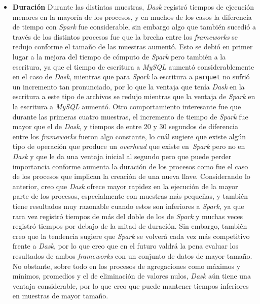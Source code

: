 \begin{itemize}
	\item \textbf{Duración} Durante las distintas muestras, \textit{Dask} registró tiempos de ejecución menores en la mayoría de los procesos, y en muchos de los casos la diferencia de tiempo con \textit{Spark} fue considerable, sin embargo algo que también sucedió a través de los distintos procesos fue que la brecha entre los \textit{frameworks} se redujo conforme el tamaño de las muestras aumentó. Esto se debió en primer lugar a la mejora del tiempo de cómputo de \textit{Spark} pero también a la escritura, ya que el tiempo de escritura a \textit{MySQL} aumentó considerablemente en el caso de \textit{Dask}, mientras que para \textit{Spark} la escritura a \texttt{parquet} no sufrió un incremento tan pronunciado, por lo que la ventaja que tenía \textit{Dask} en la escritura a este tipo de archivos se redujo mientras que la ventaja de \textit{Spark} en la escritura a \textit{MySQL} aumentó. Otro comportamiento interesante fue que durante las primeras cuatro muestras, el incremento de tiempo de \textit{Spark} fue mayor que el de \textit{Dask}, y tiempos de entre 20 y 30 segundos de diferencia entre los \textit{frameworks} fueron algo constante, lo cuál sugiere que existe algún tipo de operación que produce un \textit{overhead} que existe en\ \textit{Spark} pero no en \textit{Dask} y que le da una ventaja inicial al segundo pero que puede perder importancia conforme aumenta la duración de los procesos como fue el caso de los procesos que implican la creación de una nueva llave. Considerando lo anterior, creo que \textit{Dask} ofrece mayor rapidez en la ejecución de la mayor parte de los procesos, especialmente con muestras más pequeñas, y también tiene resultados muy razonable cuando estos son inferiores a \textit{Spark}, ya que rara vez registró tiempos de más del doble de los de \textit{Spark} y muchas veces registró tiempos por debajo de la mitad de duración. Sin embargo, también creo que la tendencia sugiere que \textit{Spark} se volverá cada vez más competitivo frente a \textit{Dask}, por lo que creo que en el futuro valdrá la pena evaluar los resultados de ambos \textit{frameworks} con un conjunto de datos de mayor tamaño. No obstante, sobre todo en los procesos de agregaciones como máximos y mínimos, promedios y el de eliminación de valores nulos, \textit{Dask} aún tiene una ventaja considerable, por lo que creo que puede mantener tiempos inferiores en muestras de mayor tamaño.
	
\end{itemize}